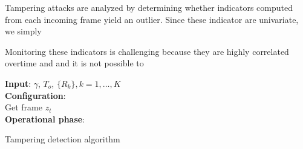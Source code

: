 \documentclass{llncs}
\begin{document}
Tampering attacks are analyzed by determining whether indicators computed from each incoming frame yield an outlier. Since these indicator are univariate, we simply 


Monitoring these indicators is challenging because they are highly correlated overtime and and it is not possible to 





\begin{algorithm}[t]
	\LinesNumbered
	\textbf{Input}: $\gamma$, $T_{o}$, $\{R_k\}, k=1,\dots,K$ \\
	\textbf{Configuration}:\\
	 
	{	 Get frame $z_t$ \\
		 
	}
	 
	\textbf{Operational phase}:\\
	    
	\caption{Tampering detection algorithm}
	\label{alg:DISPL}
\end{algorithm}
\end{document}
